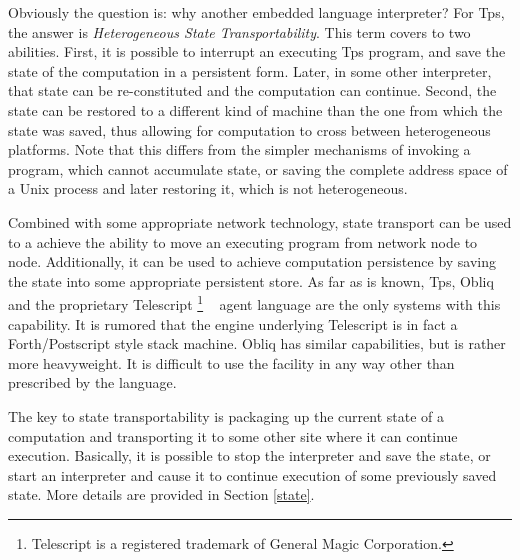 Obviously the question is: why another embedded language interpreter?
For Tps, the answer is {\em Heterogeneous State Transportability}.
This term covers to two abilities.
First, it is possible to interrupt an executing Tps program,
and save the state of the computation in a persistent form.
Later, in some other interpreter, that state can be re-constituted
and the computation can continue.
Second, the state can be restored to a different kind of
machine than the one from which the state was saved,
thus allowing for computation to cross between heterogeneous
platforms.
Note that this differs from the simpler mechanisms of invoking
a program, which cannot accumulate state,
or saving the complete address space
of a Unix process and later restoring it, which is not heterogeneous.

Combined with some appropriate network technology, state transport
can be used to a achieve the ability to move an executing
program from network node to node.
Additionally, it can be used to achieve computation
persistence by saving the state into some appropriate persistent store.
As far as is known, Tps,
Obliq~\cite{obliq94a}
and the proprietary Telescript%
\footnote{Telescript is a registered trademark of General Magic
Corporation.}
~\cite{Knaster94a}
agent language
are the only systems with this capability.
It is rumored that the engine underlying Telescript
is in fact a Forth/Postscript style stack machine.
Obliq has similar capabilities, but is rather more heavyweight.
It is difficult to use the facility in any
way other than prescribed by the language.

The key to state transportability is packaging
up the current state of a computation and transporting
it to some other site
where it can continue execution.
Basically, it is possible to stop the interpreter and save the state,
or start an interpreter and cause it to continue
execution of some previously saved state.
More details are provided in Section \ref{state}.

